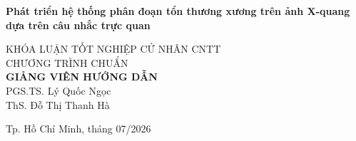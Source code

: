\begin{titlepage}
\begin{center}
{ \Large \bfseries Phát triển hệ thống phân đoạn tổn thương xương trên ảnh X-quang dựa trên câu nhắc trực quan \\[2cm]}


\large KHÓA LUẬN TỐT NGHIỆP CỬ NHÂN CNTT\\ CHƯƠNG TRÌNH CHUẨN\\[2cm]

\textbf{GIẢNG VIÊN HƯỚNG DẪN}\\
PGS.TS. Lý Quốc Ngọc\\
ThS. Đỗ Thị Thanh Hà\\



\vfill
Tp. Hồ Chí Minh, tháng 07/2026

\end{center}

\end{titlepage}